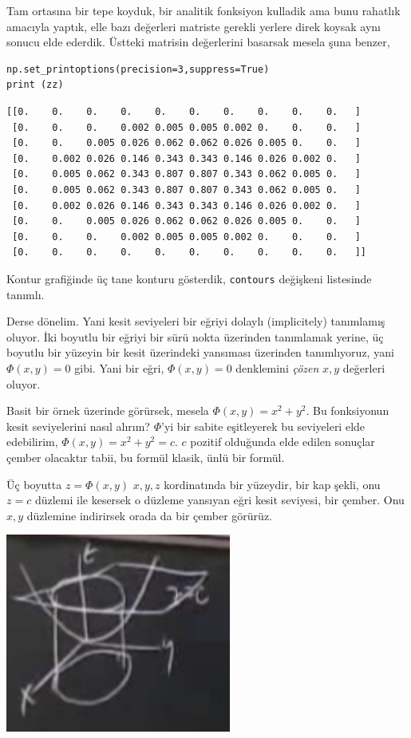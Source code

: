 \documentclass[12pt,fleqn]{article}\usepackage{../../common}
\begin{document}
Tam ortasına bir tepe koyduk, bir analitik fonksiyon kulladik ama bunu rahatlık
amacıyla yaptık, elle bazı değerleri matriste gerekli yerlere direk koysak aynı
sonucu elde ederdik. Üstteki matrisin değerlerini basarsak mesela şuna benzer,

\begin{verbatim}
np.set_printoptions(precision=3,suppress=True)
print (zz)
\end{verbatim}

\begin{verbatim}
[[0.    0.    0.    0.    0.    0.    0.    0.    0.    0.   ]
 [0.    0.    0.    0.002 0.005 0.005 0.002 0.    0.    0.   ]
 [0.    0.    0.005 0.026 0.062 0.062 0.026 0.005 0.    0.   ]
 [0.    0.002 0.026 0.146 0.343 0.343 0.146 0.026 0.002 0.   ]
 [0.    0.005 0.062 0.343 0.807 0.807 0.343 0.062 0.005 0.   ]
 [0.    0.005 0.062 0.343 0.807 0.807 0.343 0.062 0.005 0.   ]
 [0.    0.002 0.026 0.146 0.343 0.343 0.146 0.026 0.002 0.   ]
 [0.    0.    0.005 0.026 0.062 0.062 0.026 0.005 0.    0.   ]
 [0.    0.    0.    0.002 0.005 0.005 0.002 0.    0.    0.   ]
 [0.    0.    0.    0.    0.    0.    0.    0.    0.    0.   ]]
\end{verbatim}

Kontur grafiğinde üç tane konturu gösterdik, \verb!contours! değişkeni
listesinde tanımlı.

Derse dönelim. Yani kesit seviyeleri bir eğriyi dolaylı (implicitely) tanımlamış
oluyor. İki boyutlu bir eğriyi bir sürü nokta üzerinden tanımlamak yerine, üç
boyutlu bir yüzeyin bir kesit üzerindeki yansıması üzerinden tanımlıyoruz, yani
$\Phi(x,y) = 0$ gibi. Yani bir eğri, $\Phi(x,y) = 0$ denklemini {\em çözen}
$x,y$ değerleri oluyor.

Basit bir örnek üzerinde görürsek, mesela $\Phi(x,y) = x^2 + y^2$. Bu
fonksiyonun kesit seviyelerini nasıl alırım? $\Phi$'yi bir sabite eşitleyerek bu
seviyeleri elde edebilirim, $\Phi(x,y) = x^2 + y^2 = c$. $c$ pozitif olduğunda
elde edilen sonuçlar çember olacaktır tabii, bu formül klasik, ünlü bir formül.

Üç boyutta $z=\Phi(x,y)$ $x,y,z$ kordinatında bir yüzeydir, bir kap şekli, onu
$z=c$ düzlemi ile kesersek o düzleme yansıyan eğri kesit seviyesi, bir
çember. Onu $x,y$ düzlemine indirirsek orada da bir çember görürüz. 

\includegraphics[width=20em]{2_11_04.jpg}
\end{document}
